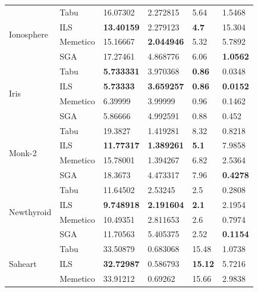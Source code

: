 \documentclass[11pt]{article}
\begin{document}
\begin{table}[h]
{\begin{tabular}{ |l|l|l|l|l|l| }
    \multirow{4}{*}{Ionosphere}   & Tabu     & 16.07302   & 2.272815     &  5.64   & 1.5468 \\
                                  & ILS      & \bf{13.40159}   & 2.279123     &  \bf{4.7}    & 15.304 \\
                                  & Memetico & 15.16667   & \bf{2.044946}     &  5.32   & 5.7892 \\
                                  & SGA      & 17.27461   & 4.868776     &  6.06   & \bf{1.0562}\\ \hline
    \multirow{4}{*}{Iris}   & Tabu     & \bf{5.733331}   & 3.970368     &  \bf{0.86}   & 0.0348 \\
                            & ILS      & \bf{5.73333}    & \bf{3.659257}     &  \bf{0.86}   & \bf{0.0152} \\
                            & Memetico & 6.39999         & 3.99999      &  0.96   & 0.1462 \\
                            & SGA      & 5.86666         & 4.992591     &  0.88   & 0.452\\ \hline
    \multirow{4}{*}{Monk-2}   & Tabu     & 19.3827    & 1.419281     &  8.32   & 0.8218 \\
                              & ILS      & \bf{11.77317}   & \bf{1.389261}     &  \bf{5.1}    & 7.9858 \\
                              & Memetico & 15.78001   & 1.394267     &  6.82   & 2.5364 \\
                              & SGA      & 18.3673    & 4.473317     &  7.96   & \bf{0.4278}\\ \hline
    \multirow{4}{*}{Newthyroid}   & Tabu     & 11.64502   & 2.53245      &  2.5    & 0.2808 \\
                                  & ILS      & \bf{9.748918}   & \bf{2.191604}     &  \bf{2.1}    & 2.1954 \\
                                  & Memetico & 10.49351   & 2.811653     &  2.6    & 0.7974 \\
                                  & SGA      & 11.70563   & 5.405375     &  2.52   & \bf{0.1154}\\ \hline
    \multirow{4}{*}{Saheart}  & Tabu     & 33.50879   & 0.683068     &  15.48  & 1.0738 \\
                              & ILS      & \bf{32.72987}   & 0.586793     &  \bf{15.12}  & 5.7216 \\
                              & Memetico & 33.91212   & 0.69262      &  15.66  & 2.9838 \\

\end{tabular}}
\end{table}
\end{document}
